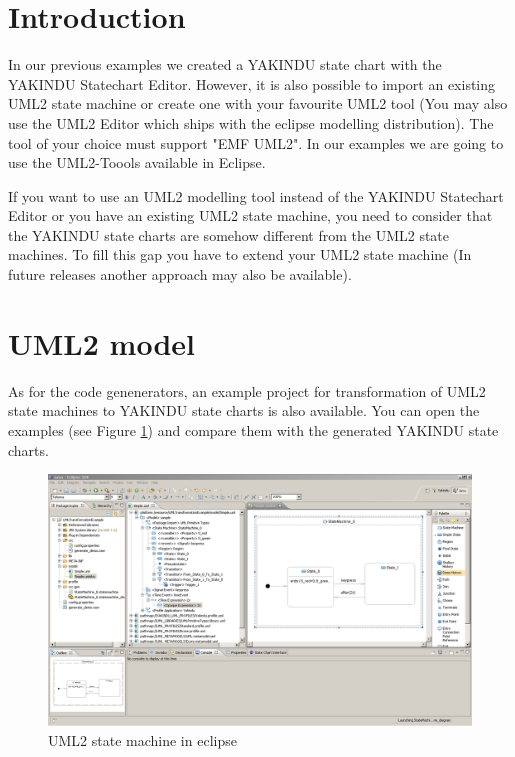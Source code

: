 %
\section{Introduction}
In our previous examples we created a YAKINDU state chart with the YAKINDU
Statechart Editor. However, it is also possible to import an existing UML2
state machine or create one with your favourite UML2 tool (You may also use
the UML2 Editor which ships with the eclipse modelling distribution). The tool
of your choice must support "EMF UML2". In our examples we are going to use
the UML2-Toools available in Eclipse.

If you want to use an UML2 modelling tool instead of the YAKINDU Statechart
Editor or you have an existing UML2 state machine, you need to consider that
the YAKINDU state charts are somehow different from the UML2 state machines.
To fill this gap you have to extend your UML2 state machine (In future
releases another approach may also be available).


\section{UML2 model}
As for the code genenerators, an example project for transformation of UML2
state machines to YAKINDU state charts is also available. You can open the
examples (see Figure \ref{fig:uml2tools}) and compare them with the generated
YAKINDU state charts. \begin{figure}[ht]
\center
\includegraphics[width=1\textwidth]{Pictures/uml2tools}
\caption{\label{fig:uml2tools}UML2 state machine in eclipse} 
\end{figure}

